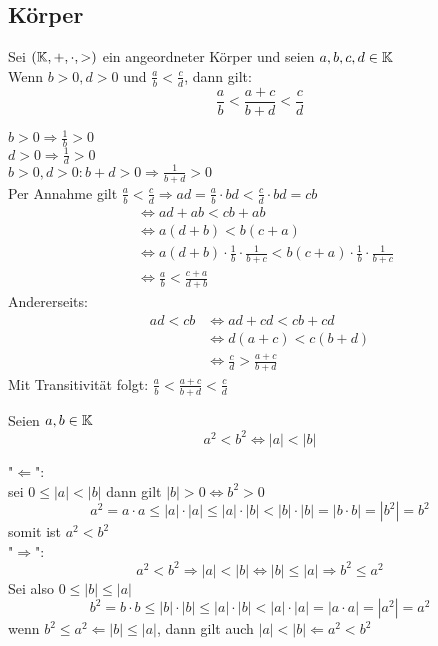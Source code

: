 \documentclass[../ana1u.tex]{subfiles}
\begin{document}
\subsection{Körper}
\begin{satz}
    Sei \((\mathbb{K},+,\cdot, >)\) ein angeordneter Körper und seien \(a,b,c,d \in \mathbb{K}\)\\
    Wenn \(b > 0, d > 0\) und \(\frac{a}{b} < \frac{c}{d}\), dann gilt:
    \[\frac{a}{b} < \frac{a+c}{b + d} < \frac{c}{d}\]
\end{satz}
\begin{bew}
    \(b > 0 \Rightarrow \frac{1}{b} > 0\)\\
    \(d > 0 \Rightarrow \frac{1}{d} > 0\)\\
    \(b > 0, d > 0: b+d > 0 \Rightarrow \frac{1}{b+d} > 0\)\\
    Per Annahme gilt \(\frac{a}{b} < \frac{c}{d} \Rightarrow ad = \frac{a}{b} \cdot bd < \frac{c}{d} \cdot bd = cb\)
    \begin{align*}
        &\Leftrightarrow ad + ab < cb + ab\\
        &\Leftrightarrow a(d+b) < b(c+a)\\
        &\Leftrightarrow a(d+b) \cdot \frac{1}{b} \cdot \frac{1}{b+c} < b(c+a) \cdot \frac{1}{b} \cdot \frac{1}{b+c}\\
        &\Leftrightarrow \frac{a}{b} < \frac{c+a}{d+b}
    \end{align*}
    Andererseits:
    \begin{align*}
        ad < cb &\Leftrightarrow ad + cd < cb + cd\\
        &\Leftrightarrow d(a+c) < c(b+d)\\
        &\Leftrightarrow \frac{c}{d} > \frac{a+c}{b+d}
    \end{align*}
    Mit Transitivität folgt: \(\frac{a}{b} < \frac{a+c}{b + d} < \frac{c}{d}\)
\end{bew}
\begin{satz}
    Seien \(a,b \in \mathbb{K}\)
    \[a^2 < b^2 \Leftrightarrow |a| < |b|\]
\end{satz}
\begin{bew}
    "\(\Leftarrow\)":\\
    sei \(0 \leq |a| < |b|\) dann gilt \(|b| > 0 \Leftrightarrow b^2 > 0\)\\
    \[a^2 = a \cdot a \leq |a| \cdot |a| \leq |a| \cdot |b| < |b| \cdot |b| = |b \cdot b| = |b^2| = b^2\]
    somit ist \(a^2 < b^2\)\\
    "\(\Rightarrow\)":\\
    \[a^2 < b^2 \Rightarrow |a| < |b| \Leftrightarrow |b| \leq |a| \Rightarrow b^2 \leq a^2\]
    Sei also \(0 \leq |b| \leq |a|\)\\
    \[b^2 = b \cdot b \leq |b| \cdot |b| \leq |a| \cdot |b| < |a| \cdot |a| = |a \cdot a| = |a^2| = a^2\]
    wenn \(b^2 \leq a^2 \Leftarrow |b| \leq |a|\), dann gilt auch \(|a| < |b| \Leftarrow a^2 < b^2\)
\end{bew}
\end{document}

